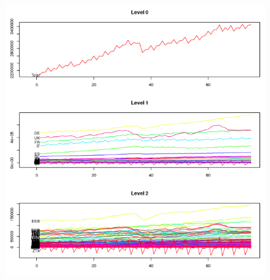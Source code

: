 \documentclass[c, dvipsnames]{beamer}  %
\begin{document}
\begin{frame}[shrink=5]
\frametitle{\insertsection} 
\framesubtitle{\insertsubsection}


\begin{figure}
	\centering
	\includegraphics[width=0.7\linewidth]{screenshot037}
	\label{fig:screenshot029}
\end{figure}


\end{frame}
\end{document}
